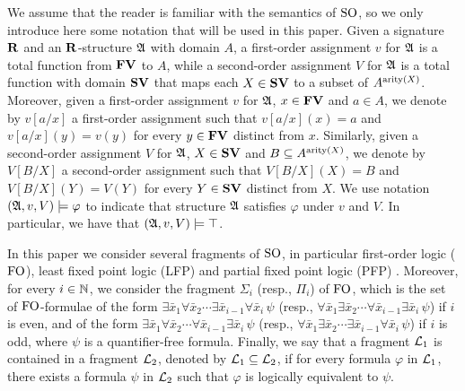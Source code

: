 We assume that the reader is familiar with the semantics of ${\rm SO}$, so we only introduce here some notation that will be used in this paper. 
Given a signature $\mathbf{R}$ and an $\mathbf{R}$-structure $\mathfrak{A}$ with domain $A$, a first-order assignment $v$ for $\mathfrak{A}$ is a total function from $\mathbf{FV}$ to $A$, while a second-order assignment $V$ for $\mathfrak{A}$ is a total function with domain $\mathbf{SV}$ that maps each $X \in \mathbf{SV}$ to a subset of $A^{{\rm arity}(X)}$. Moreover, given a first-order assignment $v$ for $\mathfrak{A}$, $x \in \mathbf{FV}$ and $a \in A$, we denote by $v[a/x]$ a first-order assignment such that $v[a/x](x) = a$ and $v[a/x](y) = v(y)$ for every $y \in \mathbf{FV}$ distinct from $x$. Similarly, given a second-order assignment $V$ for $\mathfrak{A}$, $X \in \mathbf{SV}$ and $B  \subseteq A^{{\rm arity}(X)}$, we denote by $V[B/X]$ a second-order assignment such that $V[B/X](X) = B$ and $V[B/X](Y) = V(Y)$ for every $Y \in \mathbf{SV}$ distinct from $X$. We use notation $(\mathfrak{A}, v, V) \models \varphi$ to indicate that structure $\mathfrak{A}$ satisfies $\varphi$ under $v$ and $V$. In particular, we have that $(\mathfrak{A}, v, V) \models \top$.

In this paper we consider several fragments of ${\rm SO}$, in particular first-order logic (${\rm FO}$), least fixed point logic (LFP) and partial fixed point logic (PFP) \cite{L04}. Moreover, for every $i \in \mathbb{N}$, we consider the fragment $\Sigma_i$ (resp., $\Pi_i$) of ${\rm FO}$, which is the set of ${\rm FO}$-formulae of the form 
$\exists \bar x_1 \forall \bar x_2 \cdots \exists \bar x_{i-1} \forall \bar x_{i} \, \psi$ (resp., 
$\forall \bar x_1 \exists \bar x_2 \cdots \forall \bar x_{i-1} \exists \bar x_{i} \, \psi$) if $i$ is even, and of the form
$\exists \bar x_1 \forall \bar x_2 \cdots \forall \bar x_{i-1} \exists \bar x_{i} \, \psi$ (resp., 
$\forall \bar x_1 \exists \bar x_2 \cdots \exists \bar x_{i-1} \forall \bar x_{i} \, \psi$) if $i$ is odd, where $\psi$ is a quantifier-free formula. Finally, we say that a fragment $\L_1$ is contained in a fragment $\L_2$, denoted by $\L_1 \subseteq \L_2$, if for every formula $\varphi$ in $\L_1$, there exists a formula $\psi$ in $\L_2$ such that $\varphi$ is logically equivalent to $\psi$. 




